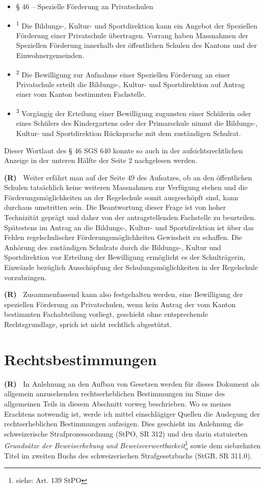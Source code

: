 \documentclass[paper=a4,fontsize=12pt, oneside, numbers=noenddot]{scrbook}
\newcounter{rz}
\newcommand{\Rz}{
	\addtocounter{rz}{1}\textbf{(R\arabic{rz})~}
}
\begin{document}
\begin{itemize}[noitemsep]\setlength\itemsep{0.3em}
	\item[] § 46 -- Spezielle Förderung an Privatschulen
	\item[] \textsuperscript{1}	Die Bildungs-, Kultur- und Sportdirektion kann ein Angebot der Speziellen Förderung einer Privatschule übertragen. Vorrang haben Massnahmen der Speziellen Förderung innerhalb der öffentlichen Schulen des Kantons und der Einwohnergemeinden.
	\item[] \textsuperscript{2}
	Die Bewilligung zur Aufnahme einer Speziellen Förderung an einer Privatschule erteilt die Bildungs-, Kultur- und Sportdirektion auf Antrag einer vom Kanton bestimmten Fachstelle.
	\item[] \textsuperscript{3}
	Vorgängig der Erteilung einer Bewilligung zugunsten einer Schülerin oder eines Schülers des Kindergartens oder der Primarschule nimmt die Bildungs-, Kultur- und Sportdirektion Rücksprache mit dem zuständigen Schulrat.
\end{itemize} 
Dieser Wortlaut des § 46 SGS 640 konnte so auch in der aufsichtsrechtlichen Anzeige in der unteren Hälfte der Seite 2 nachgelesen werden. 

\Rz Weiter erfährt man auf der Seite 49 des Aufsatzes, ob an den öffentlichen Schulen tatsächlich keine weiteren Massnahmen zur Verfügung stehen und die Förderungsmöglichkeiten an der Regelschule somit ausgeschöpft sind, kann durchaus umstritten sein. Die Beantwortung dieser Frage ist von hoher Technizität geprägt und daher von der antragstellenden Fachstelle zu beurteilen. Spätestens im Antrag an die Bildungs-, Kultur- und Sportdirektion ist über das Fehlen regelschulischer Förderungsmöglichkeiten Gewissheit zu schaffen. Die Anhörung des zuständigen Schulrats durch die Bildungs-, Kultur und Sportdirektion vor Erteilung der Bewilligung ermöglicht es der Schulträgerin, Einwände bezüglich Ausschöpfung der Schulungsmöglichkeiten in der Regelschule vorzubringen.

\Rz Zusammenfassend kann also festgehalten werden, eine Bewilligung der speziellen Förderung an Privatschulen, wenn kein Antrag der vom Kanton bestimmten Fachabteilung vorliegt, geschieht ohne entsprechende Rechtsgrundlage, sprich ist nicht rechtlich abgestützt.






\chapter{Rechtsbestimmungen}
\Rz In Anlehnung an den Aufbau von Gesetzen werden für dieses Dokument als allgemein anzusehenden rechtserheblichen Bestimmungen im Sinne des allgemeinen Teils in diesem Abschnitt vorweg beschrieben. Wo es meines Erachtens notwendig ist, werde ich mittel einschlägiger Quellen die Auslegung der rechtserheblichen Bestimmungen aufzeigen. Dies geschieht im Anlehnung die schweizerische Strafprozessordnung (StPO, SR 312) und den darin statuierten \textit{Grundsätze der Beweiserhebung und Beweisverwertbarkeit}\footnote{siehe: Art. 139 StPO} sowie dem siebzehnten Titel im zweiten Buchs des schweizerischen Strafgesetzbuchs (StGB, SR 311.0).
\end{document}
